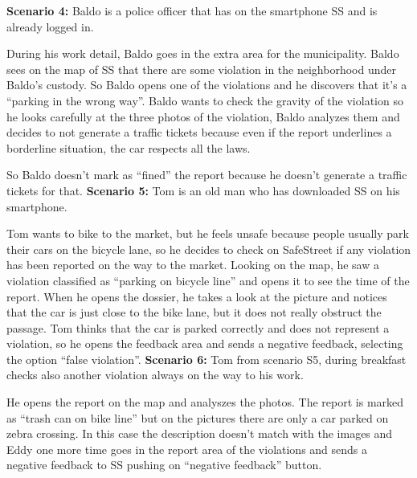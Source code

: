 \documentclass[../RASD.tex]{subfiles}
\begin{document}
    \newline
    \newline
                \textbf{Scenario 4:} Baldo is a police officer that has on the smartphone SS and is already logged in.

                                    During his work detail, Baldo goes in the extra area for the municipality. Baldo sees on the map of SS that there are some violation in the neighborhood under Baldo’s custody. So Baldo opens one of the violations and he discovers that it’s a “parking in the wrong way”. Baldo wants to check the gravity of the violation so he looks carefully at the three photos of the violation, Baldo analyzes them and decides to not generate a traffic tickets because even if the report underlines a borderline situation, the car respects all the laws.

                                     So Baldo doesn’t mark as “fined” the report because he doesn’t generate a traffic tickets for that.
    \newline
    \newline
                \textbf{Scenario 5:} Tom is an old man who has downloaded SS on his smartphone.

                Tom wants to bike to the market, but he feels unsafe because people usually park their cars on the bicycle lane, so he decides to check on SafeStreet if any violation has been reported on the way to the market.  Looking on the map, he saw a violation classified as “parking on bicycle line” and opens it to see the time of the report. When he opens the dossier, he takes a look at the picture and notices that the car is just close to the bike lane, but it does not really obstruct the passage. Tom thinks that the car is parked correctly and does not represent a violation, so he opens the feedback area and sends a negative feedback, selecting the option “false violation”.
                \newline
                \newline
                \textbf{Scenario 6:} Tom from scenario S5, during breakfast checks also another violation always on the way to his work.

                 He opens the report on the map and analyszes the photos. The report is marked as “trash can on bike line” but on the pictures there are only a car parked on zebra crossing. In this case the description doesn’t match with the images and Eddy one more time goes in the report area of the violations and sends a negative feedback to SS pushing on “negative feedback” button.
\end{document}
